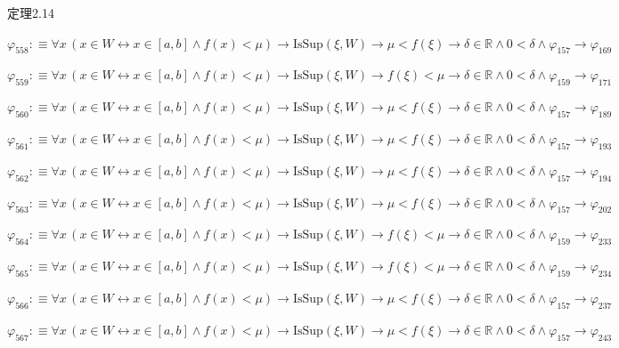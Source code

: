 \begin{fullproof}{定理2.14}
\begin{abbrevlist}
\item $\varphi_{558} :\equiv \forall x\,(x \in W \leftrightarrow x \in [a,b] \land f(x) < \mu) \to \mathrm{IsSup}(\xi,W) \to \mu < f(\xi) \to \delta \in \mathbb{R} \land 0 < \delta \land \varphi_{157} \to \varphi_{169}$
\item $\varphi_{559} :\equiv \forall x\,(x \in W \leftrightarrow x \in [a,b] \land f(x) < \mu) \to \mathrm{IsSup}(\xi,W) \to f(\xi) < \mu \to \delta \in \mathbb{R} \land 0 < \delta \land \varphi_{159} \to \varphi_{171}$
\item $\varphi_{560} :\equiv \forall x\,(x \in W \leftrightarrow x \in [a,b] \land f(x) < \mu) \to \mathrm{IsSup}(\xi,W) \to \mu < f(\xi) \to \delta \in \mathbb{R} \land 0 < \delta \land \varphi_{157} \to \varphi_{189}$
\item $\varphi_{561} :\equiv \forall x\,(x \in W \leftrightarrow x \in [a,b] \land f(x) < \mu) \to \mathrm{IsSup}(\xi,W) \to \mu < f(\xi) \to \delta \in \mathbb{R} \land 0 < \delta \land \varphi_{157} \to \varphi_{193}$
\item $\varphi_{562} :\equiv \forall x\,(x \in W \leftrightarrow x \in [a,b] \land f(x) < \mu) \to \mathrm{IsSup}(\xi,W) \to \mu < f(\xi) \to \delta \in \mathbb{R} \land 0 < \delta \land \varphi_{157} \to \varphi_{194}$
\item $\varphi_{563} :\equiv \forall x\,(x \in W \leftrightarrow x \in [a,b] \land f(x) < \mu) \to \mathrm{IsSup}(\xi,W) \to \mu < f(\xi) \to \delta \in \mathbb{R} \land 0 < \delta \land \varphi_{157} \to \varphi_{202}$
\item $\varphi_{564} :\equiv \forall x\,(x \in W \leftrightarrow x \in [a,b] \land f(x) < \mu) \to \mathrm{IsSup}(\xi,W) \to f(\xi) < \mu \to \delta \in \mathbb{R} \land 0 < \delta \land \varphi_{159} \to \varphi_{233}$
\item $\varphi_{565} :\equiv \forall x\,(x \in W \leftrightarrow x \in [a,b] \land f(x) < \mu) \to \mathrm{IsSup}(\xi,W) \to f(\xi) < \mu \to \delta \in \mathbb{R} \land 0 < \delta \land \varphi_{159} \to \varphi_{234}$
\item $\varphi_{566} :\equiv \forall x\,(x \in W \leftrightarrow x \in [a,b] \land f(x) < \mu) \to \mathrm{IsSup}(\xi,W) \to \mu < f(\xi) \to \delta \in \mathbb{R} \land 0 < \delta \land \varphi_{157} \to \varphi_{237}$
\item $\varphi_{567} :\equiv \forall x\,(x \in W \leftrightarrow x \in [a,b] \land f(x) < \mu) \to \mathrm{IsSup}(\xi,W) \to \mu < f(\xi) \to \delta \in \mathbb{R} \land 0 < \delta \land \varphi_{157} \to \varphi_{243}$

\end{abbrevlist}
\end{fullproof}

